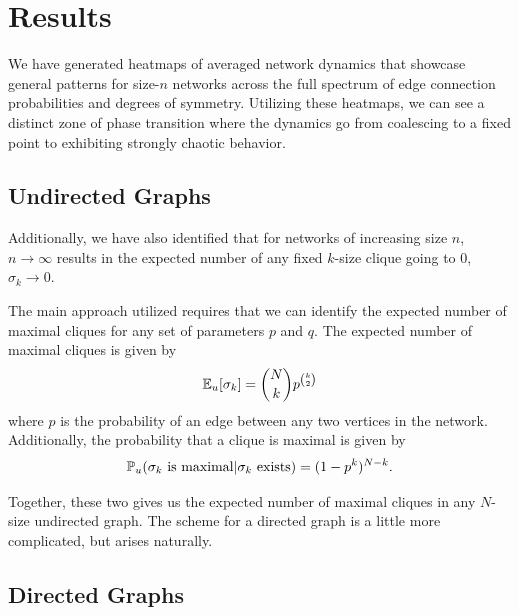 
\section{Results}
\label{sec:Results}

We have generated heatmaps of averaged network dynamics that showcase general patterns for size-$n$ networks across the full spectrum of edge connection probabilities and degrees of symmetry. Utilizing these heatmaps, we can see a distinct zone of phase transition where the dynamics go from coalescing to a fixed point to exhibiting strongly chaotic behavior.


\subsection{Undirected Graphs}%
\label{sub:Undirected Graphs}

Additionally, we have also identified that for networks of increasing size $n$, $n\to\infty$ results in the expected number of any fixed $k$-size clique going to 0, $\sigma_k \to 0$.

The main approach utilized requires that we can identify the expected number of maximal cliques for any set of parameters $p$ and $q$. The expected number of maximal cliques is given by
\begin{align}
    \label{eq:e of max}
    \mathbb{E}_u[\sigma_k] = \binom{N}{k}p^{\binom{k}{2}}
\end{align}
where $p$ is the probability of an edge between any two vertices in the network.
Additionally, the probability that a clique is maximal is given by
\begin{align}
    \label{eq:p max undirected}
    \mathbb{P}_u{(\sigma_k \mbox{ is maximal}|\sigma_k \mbox{ exists})} = (1-p^k)^{N-k}.
\end{align}

Together, these two gives us the expected number of maximal cliques in any $N$-size undirected graph. The scheme for a directed graph is a little more complicated, but arises naturally.

\subsection{Directed Graphs}%
\label{sub:Directed Graphs}

